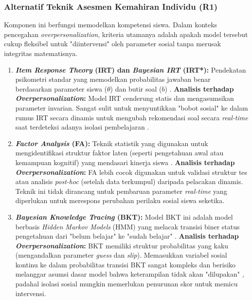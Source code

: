 \subsubsection{Alternatif Teknik Asesmen Kemahiran Individu (R1)}
\label{sssec:alternatif_asesmen_individu}
Komponen ini berfungsi memodelkan kompetensi siswa. Dalam konteks pencegahan \textit{overpersonalization}, kriteria utamanya adalah apakah model tersebut cukup fleksibel untuk "diintervensi" oleh parameter sosial tanpa merusak integritas matematisnya.

\begin{enumerate}
    \item \textbf{\textit{Item Response Theory} (IRT) dan \textit{Bayesian IRT} (IRT*):}
    Pendekatan psikometri standar yang memodelkan probabilitas jawaban benar berdasarkan parameter siswa ($\theta$) dan butir soal ($b$) \autocite{Handayani2025}.
    \textbf{Analisis terhadap \textit{Overpersonalization}:} Model IRT cenderung statis dan mengasumsikan parameter invarian. Sangat sulit untuk menyuntikkan "bobot sosial" ke dalam rumus IRT secara dinamis untuk mengubah rekomendasi soal secara \textit{real-time} saat terdeteksi adanya isolasi pembelajaran \autocite{Vesin2022}.

    \item \textbf{\textit{Factor Analysis} (FA):}
    Teknik statistik yang digunakan untuk mengidentifikasi struktur faktor laten (seperti pengetahuan awal atau kemampuan kognitif) yang mendasari kinerja siswa \autocite{Ihichr2024}.
    \textbf{Analisis terhadap \textit{Overpersonalization}:} FA lebih cocok digunakan untuk validasi struktur tes atau analisis \textit{post-hoc} (setelah data terkumpul) daripada pelacakan dinamis. Teknik ini tidak dirancang untuk pembaruan parameter \textit{real-time} yang diperlukan untuk merespons perubahan perilaku sosial siswa seketika.

    \item \textbf{\textit{Bayesian Knowledge Tracing} (BKT):}
    Model BKT ini adalah model berbasis \textit{Hidden Markov Models} (HMM) yang melacak transisi biner status pengetahuan dari "belum belajar" ke "sudah belajar" \autocite{Minn2022}.
    \textbf{Analisis terhadap \textit{Overpersonalization}:} BKT memiliki struktur probabilitas yang kaku (mengandalkan parameter \textit{guess} dan \textit{slip}). Memasukkan variabel sosial kontinu ke dalam probabilitas transisi BKT sangat kompleks dan berisiko melanggar asumsi dasar model bahwa keterampilan tidak akan "dilupakan" \autocite{Ihichr2024}, padahal isolasi sosial mungkin memerlukan penurunan skor untuk memicu intervensi.


\end{enumerate}
